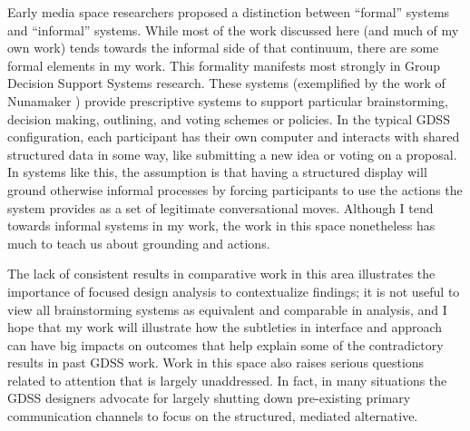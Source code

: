 Early media space researchers proposed a distinction between ``formal'' systems and ``informal'' systems. \citep{Olson:1991vz} While most of the work discussed here (and much of my own work) tends towards the informal side of that continuum, there are some formal elements in my work. This formality manifests most strongly in Group Decision Support Systems research. These systems (exemplified by the work of Nunamaker \citep{nunamaker_electronic_1991}) provide prescriptive systems to support particular brainstorming, decision making, outlining, and voting schemes or policies. In the typical GDSS configuration, each participant has their own computer and interacts with shared structured data in some way, like submitting a new idea or voting on a proposal. In systems like this, the assumption is that having a structured display will ground otherwise informal processes by forcing participants to use the actions the system provides as a set of legitimate conversational moves. Although I tend towards informal systems in my work, the work in this space nonetheless has much to teach us about grounding and actions. 

The lack of consistent results in comparative work in this area \citep{Dennis:1988ww} illustrates the importance of focused design analysis to contextualize findings; it is not useful to view all brainstorming systems as equivalent and comparable in analysis, and I hope that my work will illustrate how the subtleties in interface and approach can have big impacts on outcomes that help explain some of the contradictory results in past GDSS work. Work in this space also raises serious questions related to attention that is largely unaddressed. In fact, in many situations the GDSS designers advocate for largely shutting down pre-existing primary communication channels to focus on the structured, mediated alternative.

